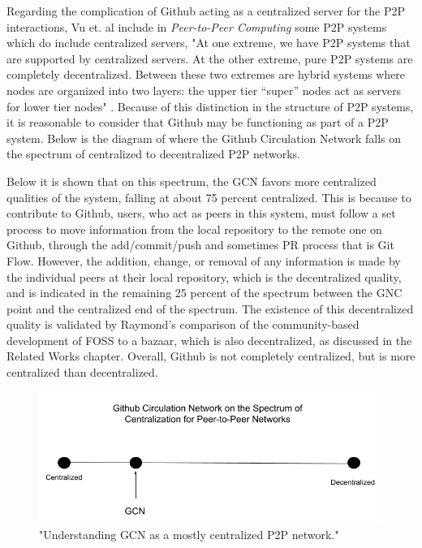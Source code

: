 Regarding the complication of Github acting as a centralized server for the P2P interactions, Vu et. al include in \textit{Peer-to-Peer Computing} some P2P systems which do include centralized servers, "At one extreme, we
have P2P systems that are supported by centralized servers. At the other extreme,
pure P2P systems are completely decentralized. Between these two extremes are
hybrid systems where nodes are organized into two layers: the upper tier “super”
nodes act as servers for lower tier nodes" \cite{peertopeercomputing}. Because of this distinction in the structure of P2P systems, it is reasonable to consider that Github may be functioning as part of a P2P system. Below is the diagram of where the Github Circulation Network falls on the spectrum of centralized to decentralized P2P networks.

Below it is shown that on this spectrum, the GCN favors more centralized qualities of the system, falling at about 75 percent centralized. This is because to contribute to Github, users, who act as peers in this system, must follow a set process to move information from the local repository to the remote one on Github, through the add/commit/push and sometimes PR process that is Git Flow. However, the addition, change, or removal of any information is made by the individual peers at their local repository, which is the decentralized quality, and is indicated in the remaining 25 percent of the spectrum between the GNC point and the centralized end of the spectrum. The existence of this decentralized quality is validated by Raymond's comparison of the community-based development of FOSS to a bazaar, which is also decentralized, as discussed in the Related Works chapter. Overall, Github is not completely centralized, but is more centralized than decentralized. 

\begin{figure}[hbt!]
\begin{center}
\includegraphics[width=.8\textwidth]{./images/github_central_spectrum.png}
\caption{"Understanding GCN as a mostly centralized P2P network."}
\vspace{0in}
\end{center}
\end{figure}

